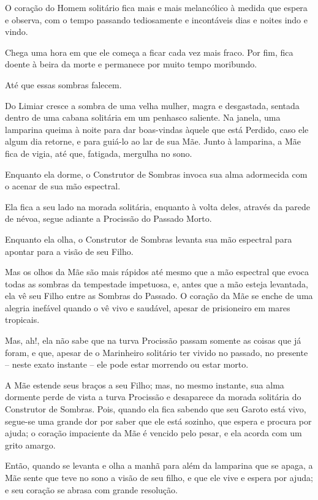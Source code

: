 O coração do Homem solitário fica mais e mais melancólico à medida que
espera e observa, com o tempo passando tediosamente e incontáveis dias e
noites indo e vindo.

\smallskip
Chega uma hora em que ele começa a ficar cada vez mais fraco. Por fim,
fica doente à beira da morte e permanece por muito tempo moribundo.

Até que essas sombras falecem.

\smallskip
Do Limiar cresce a sombra de uma velha mulher, magra e desgastada,
sentada dentro de uma cabana solitária em um penhasco saliente. Na
janela, uma lamparina queima à noite para dar boas-vindas àquele que
está Perdido, caso ele algum dia retorne, e para guiá-lo ao lar de sua
Mãe. Junto à lamparina, a Mãe fica de vigia, até que, fatigada, mergulha
no sono.

Enquanto ela dorme, o Construtor de Sombras invoca sua alma adormecida
com o acenar de sua mão espectral.

Ela fica a seu lado na morada solitária, enquanto à volta deles, através
da parede de névoa, segue adiante a Procissão do Passado Morto.

Enquanto ela olha, o Construtor de Sombras levanta sua mão espectral
para apontar para a visão de seu Filho.

Mas os olhos da Mãe são mais rápidos até mesmo que a mão espectral que
evoca todas as sombras da tempestade impetuosa, e, antes que a mão
esteja levantada, ela vê seu Filho entre as Sombras do Passado. O
coração da Mãe se enche de uma alegria inefável quando o vê vivo e
saudável, apesar de prisioneiro em mares tropicais.

Mas, ah!, ela não sabe que na turva Procissão passam somente as coisas
que já foram, e que, apesar de o Marinheiro solitário ter vivido no
passado, no presente -- neste exato instante -- ele pode estar morrendo
ou estar morto.

A Mãe estende seus braços a seu Filho; mas, no mesmo instante, sua alma
dormente perde de vista a turva Procissão e desaparece da morada
solitária do Construtor de Sombras. Pois, quando ela fica sabendo que
seu Garoto está vivo, segue-se uma grande dor por saber que ele está
sozinho, que espera e procura por ajuda; o coração impaciente da Mãe é
vencido pelo pesar, e ela acorda com um grito amargo.

Então, quando se levanta e olha a manhã para além da lamparina que se
apaga, a Mãe sente que teve no sono a visão de seu filho, e que ele vive
e espera por ajuda; e seu coração se abrasa com grande resolução.

